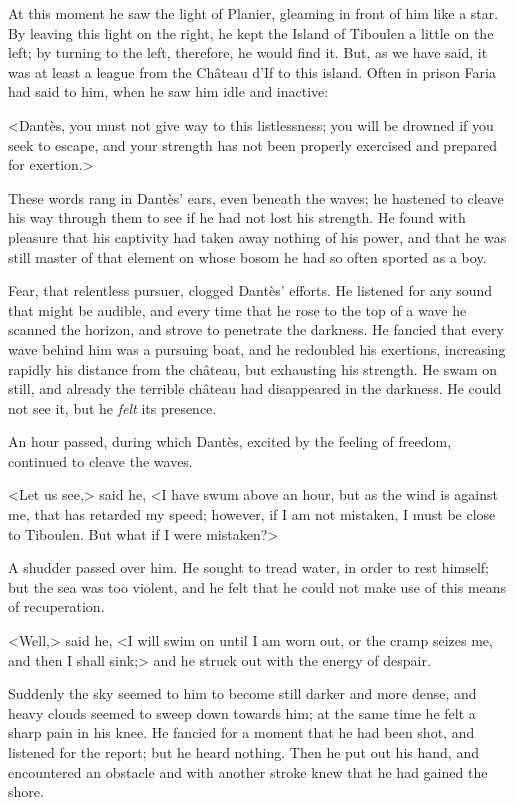  At this moment he saw the light of Planier, gleaming in front of him like a star. By leaving this light on the right, he kept the Island of Tiboulen a little on the left; by turning to the left, therefore, he would find it. But, as we have said, it was at least a league from the Château d'If to this island. Often in prison Faria had said to him, when he saw him idle and inactive: 

 <Dantès, you must not give way to this listlessness; you will be drowned if you seek to escape, and your strength has not been properly exercised and prepared for exertion.> 

 These words rang in Dantès' ears, even beneath the waves; he hastened to cleave his way through them to see if he had not lost his strength. He found with pleasure that his captivity had taken away nothing of his power, and that he was still master of that element on whose bosom he had so often sported as a boy. 

 Fear, that relentless pursuer, clogged Dantès' efforts. He listened for any sound that might be audible, and every time that he rose to the top of a wave he scanned the horizon, and strove to penetrate the darkness. He fancied that every wave behind him was a pursuing boat, and he redoubled his exertions, increasing rapidly his distance from the château, but exhausting his strength. He swam on still, and already the terrible château had disappeared in the darkness. He could not see it, but he \textit{felt} its presence. 

 An hour passed, during which Dantès, excited by the feeling of freedom, continued to cleave the waves. 

 <Let us see,> said he, <I have swum above an hour, but as the wind is against me, that has retarded my speed; however, if I am not mistaken, I must be close to Tiboulen. But what if I were mistaken?> 

 A shudder passed over him. He sought to tread water, in order to rest himself; but the sea was too violent, and he felt that he could not make use of this means of recuperation. 

 <Well,> said he, <I will swim on until I am worn out, or the cramp seizes me, and then I shall sink;> and he struck out with the energy of despair. 

 Suddenly the sky seemed to him to become still darker and more dense, and heavy clouds seemed to sweep down towards him; at the same time he felt a sharp pain in his knee. He fancied for a moment that he had been shot, and listened for the report; but he heard nothing. Then he put out his hand, and encountered an obstacle and with another stroke knew that he had gained the shore. 

